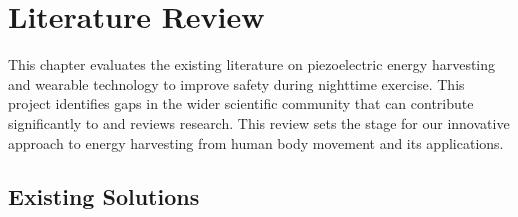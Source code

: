 \documentclass[11pt]{report}	%
\begin{document}
\newpage 


\chapter{Literature Review}
This chapter evaluates the existing literature on piezoelectric energy harvesting and wearable technology to improve safety during nighttime exercise. This project identifies gaps in the wider scientific community that can contribute significantly to and reviews research. This review sets the stage for our innovative approach to energy harvesting from human body movement and its applications.



\section{Existing Solutions}
\end{document}
